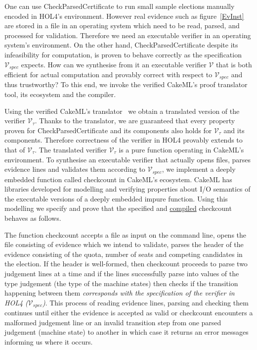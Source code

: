 \documentclass[10pt,conference]{IEEEtran}
\begin{document}
One can use Check\textunderscore{}Parsed\textunderscore{}Certificate to run small sample elections manually encoded in HOL4's environment. However real evidence such as figure~\ref{EvInst} are stored in a file in an operating system which need to be read, parsed, and processed for validation. Therefore we need an executable verifier in an operating system's environment. On the other hand, Check\textunderscore{}Parsed\textunderscore{}Certificate despite its infeasibility for computation, is proven to behave correctly as the specification $\mathcal{V}_{spec}$ expects. How can we synthesise from it an executable verifier $\mathcal{V}$ that is both efficient for actual computation and provably correct with respect to $\mathcal{V}_{spec}$ and thus trustworthy? To this end, we invoke the verified CakeML's proof translator tool, its ecosystem and the compiler.

Using the verified CakeML's translator~\cite{cake} we obtain a translated version of the verifier $\mathcal{V}_{\tau}$. Thanks to the translator, we are guaranteed that every property proven for  
 Check\textunderscore{}Parsed\textunderscore{}Certificate and its components also holds for $\mathcal{V}_{\tau}$ and its components. Therefore correctness of the verifier in HOL4 provably extends to that of $\mathcal{V}_{\tau}$. The translated verifier $\mathcal{V}_{\tau}$ is a pure function operating in CakeML's environment. To synthesise an executable verifier that actually opens files, parses evidence lines and validates them according to $\mathcal{V}_{spec}$, we implement a deeply embedded function called check\textunderscore{}count in CakeML's ecosystem.  CakeML has  libraries developed for modelling and verifying properties about I/O semantics of the executable versions  of a deeply embedded impure function.  Using this modelling we specify and prove that the specified and \underline{compiled} check\textunderscore{}count behaves as follows. 
 
 The function check\textunderscore{}count accepts a file as input on the command line, opens the file consisting of  evidence which we intend to validate, parses the header of the evidence consisting of the quota, number of seats and competing candidates in the election. If the header is well-formed, then check\textunderscore{}count proceeds to parse two judgement lines at a time and if the lines  successfully parse into  values of the type judgement (the type of the machine states) then checks if  the transition happening between them \emph{corresponds with the specification of the verifier in HOL4 ($\mathcal{V}_{spec}$)}. This process of reading evidence lines, parsing and checking them continues until either the evidence is accepted as valid or  check\textunderscore{}count encounters a malformed judgement line or an invalid transition step from one parsed judgement (machine state) to another  in which case it returns an error messages  informing us where it occurs.  
 
\end{document}
